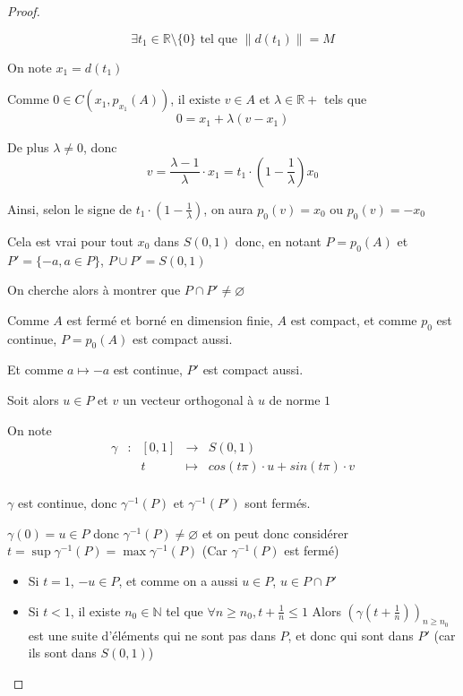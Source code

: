 \documentclass[a4paper]{article}
\newcommand{\norm}[1]{\left\lVert#1\right\rVert}
\begin{document}
\begin{proof}
\begin{itemize}
\[\exists t_{1} \in \mathbb{R}\setminus\{0\} \text{ tel que } \norm{d(t_{1})} = M\]

On note $x_{1} = d(t_{1})$

Comme $0 \in C(x_{1}, p_{x_{1}}(A))$, il existe $v \in A$ et $\lambda \in \mathbb{R}+$ tels que \[0 = x_{1} + \lambda (v - x_{1})\]

De plus $\lambda \neq 0$, donc \[v = \frac{\lambda - 1}{\lambda} \cdot x_{1} = t_{1} \cdot (1 - \frac{1}{\lambda}) x_{0}\]

Ainsi, selon le signe de $t_{1} \cdot (1 - \frac{1}{\lambda})$, on aura $p_{0}(v) = x_{0}$ ou $p_{0}(v) = - x_{0}$

Cela est vrai pour tout $x_{0}$ dans $S(0, 1)$ donc, en notant $P = p_{0}(A)$ et $P' = \{-a, a \in P \}$, $P \cup P' = S(0, 1)$

\bigskip

On cherche alors à montrer que $ P \cap P' \neq \varnothing$

Comme $A$ est fermé et borné en dimension finie, $A$ est compact, et comme $p_{0}$ est continue, $P = p_{0}(A)$ est compact aussi.

Et comme $a \mapsto -a$ est continue, $P'$ est compact aussi.

Soit alors $u \in P$ et $v$ un vecteur orthogonal à $u$ de norme $1$

On note 
\[\begin{array}{ccccl}
\gamma & : & [0, 1] & \to     & S(0, 1) \\
       &   & t      & \mapsto & cos(t\pi) \cdot u + sin(t\pi) \cdot v \\
\end{array}\]

$\gamma$ est continue, donc $\gamma^{-1}(P)$ et $\gamma^{-1}(P')$ sont fermés.

$\gamma(0) = u \in P$ donc $\gamma^{-1}(P) \neq \varnothing$ et on peut donc considérer $t = \sup \gamma^{-1}(P) = \max \gamma^{-1}(P)$ (Car $\gamma^{-1}(P)$ est fermé)

\begin{itemize}
\item Si $t = 1$, $-u \in P$, et comme on a aussi $u \in P$, $u \in P \cap P'$
\medskip
\item Si $t < 1$, il existe $n_{0} \in \mathbb{N}$ tel que $\forall n \geqslant n_{0}, t + \frac{1}{n} \leqslant 1$
Alors $(\gamma(t + \frac{1}{n}))_{n \geqslant n_{0}}$ est une suite d'éléments qui ne sont pas dans $P$, et donc qui sont dans $P'$ (car ils sont dans $S(0, 1)$)



\end{itemize}
\end{itemize}
\end{proof}
\end{document}
